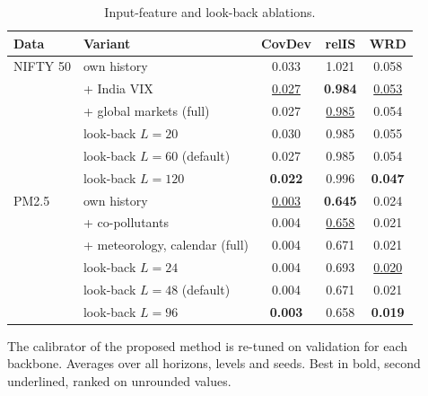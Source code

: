 \begin{table}[!t]\centering\caption{Input-feature and look-back ablations.}\label{tab:featlook}
\scriptsize\setlength{\tabcolsep}{3pt}\begin{tabular}{llccc}\toprule
Data & Variant & CovDev & relIS & WRD\\\midrule
NIFTY 50 & own history & 0.033 & 1.021 & 0.058\\
 & + India VIX & \underline{0.027} & \textbf{0.984} & \underline{0.053}\\
 & + global markets (full) & 0.027 & \underline{0.985} & 0.054\\
 & look-back $L=20$ & 0.030 & 0.985 & 0.055\\
 & look-back $L=60$ (default) & 0.027 & 0.985 & 0.054\\
 & look-back $L=120$ & \textbf{0.022} & 0.996 & \textbf{0.047}\\
\midrule
PM2.5 & own history & \underline{0.003} & \textbf{0.645} & 0.024\\
 & + co-pollutants & 0.004 & \underline{0.658} & 0.021\\
 & + meteorology, calendar (full) & 0.004 & 0.671 & 0.021\\
 & look-back $L=24$ & 0.004 & 0.693 & \underline{0.020}\\
 & look-back $L=48$ (default) & 0.004 & 0.671 & 0.021\\
 & look-back $L=96$ & \textbf{0.003} & 0.658 & \textbf{0.019}\\
\bottomrule\end{tabular}
\par\smallskip\parbox{\linewidth}{\scriptsize The calibrator of the proposed method is re-tuned on validation for each backbone. Averages over all horizons, levels and seeds. Best in bold, second underlined, ranked on unrounded values.}
\end{table}
